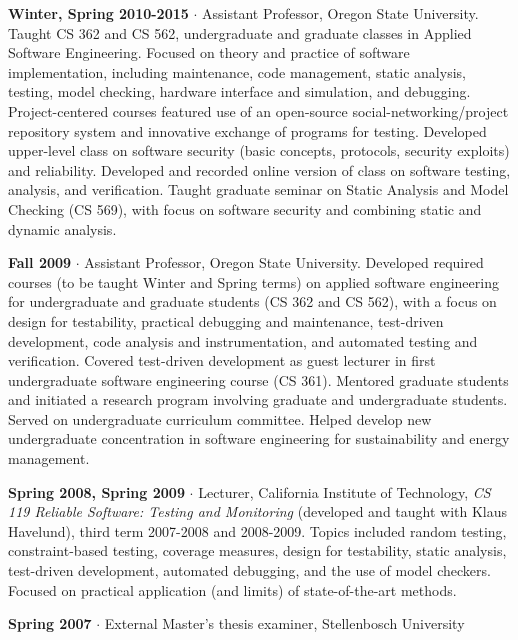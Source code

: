 \documentclass[ComputerScience]{vita}
\begin{document}
\begin{vita}
\begin{Teaching}
\item{\bf Winter, Spring 2010-2015} $\cdot$  Assistant Professor, Oregon State University.  Taught CS 362 and CS 562, undergraduate and graduate classes in Applied Software Engineering.  Focused on theory and practice of software implementation, including maintenance, code management, static analysis, testing, model checking, hardware interface and simulation, and debugging.  Project-centered courses featured use of an open-source social-networking/project repository system and  innovative exchange of programs for testing.  Developed upper-level class on software security (basic concepts, protocols, security exploits) and reliability.  Developed and recorded online version of class on software testing, analysis, and verification.  Taught graduate seminar on Static Analysis and Model Checking (CS 569), with focus on software security and combining static and dynamic analysis.

\item{\bf Fall 2009} $\cdot$ Assistant Professor, Oregon State
  University.  Developed required courses (to be taught Winter and
  Spring terms) on applied software engineering for undergraduate and
  graduate students (CS 362 and CS 562), with a focus on design for
  testability, practical debugging and maintenance, test-driven
  development, code analysis and instrumentation, and automated
  testing and verification. Covered test-driven development as guest
  lecturer in first undergraduate software engineering course (CS
  361). Mentored graduate students and initiated a research program
  involving graduate and undergraduate students.  Served on
  undergraduate curriculum committee. Helped develop new undergraduate
  concentration in software engineering for sustainability and energy
  management.

  \item {\bf Spring 2008, Spring 2009} $\cdot$ Lecturer, California
  Institute of Technology, \emph{CS 119 Reliable Software: Testing and
  Monitoring} (developed and taught with Klaus Havelund), third term
  2007-2008 and 2008-2009.  Topics included random testing,
  constraint-based testing, coverage measures, design for testability, static analysis,
  test-driven development, automated debugging, and the use of model
  checkers.  Focused on practical application (and limits)
  of state-of-the-art methods.

  \item  {\bf Spring 2007} $\cdot$ External Master's thesis examiner, Stellenbosch University


\end{Teaching}
\end{vita}
\end{document}
